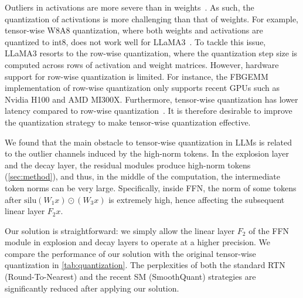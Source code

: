 Outliers in activations are more severe than in weights~\cite{xiao2023smoothquant}.
As such, the quantization of activations is more challenging than that of weights.
For example, tensor-wise W8A8 quantization, where both weights and activations are quantized to int8, does not work well for LLaMA3~\cite{grattafiori2024llama}.
To tackle this issue, LLaMA3 resorts to the row-wise quantization, where the quantization step size is computed across rows of activation and weight matrices.
However, hardware support for row-wise quantization is limited.
For instance, the FBGEMM~\cite{FBGEMM}
implementation of row-wise quantization only supports recent GPUs such as Nvidia H100 and AMD MI300X.
Furthermore, tensor-wise quantization has lower latency compared to row-wise quantization~\cite{xiao2023smoothquant}.
It is therefore desirable to improve the quantization strategy to make tensor-wise quantization effective.

We found that the main obstacle to tensor-wise quantization in LLMs is related to the outlier channels induced by the high-norm tokens.
In the explosion layer and the decay layer, the residual modules produce high-norm tokens (\cref{sec:method}), and thus, in the middle of the computation, the intermediate token norms can be very large.
Specifically, inside FFN, the norm of some tokens after \(\textrm{silu}(W_1 x)\odot (W_3 x)\) is extremely high, hence affecting the subsequent linear layer \(F_2 x\).

Our solution is straightforward: we simply allow the linear layer \(F_2\) of the FFN module in explosion and decay layers to operate at a higher precision.
We compare the performance of our solution with the original tensor-wise quantization in \cref{tab:quantization}.
The perplexities of both the standard RTN (Round-To-Nearest) and the recent SM (SmoothQuant) strategies are significantly reduced after applying our solution.

